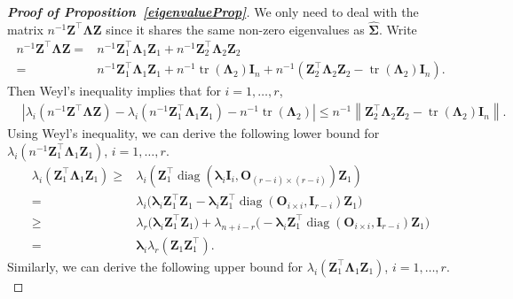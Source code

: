 \documentclass[12pt]{article} %
\DeclareMathOperator{\mytr}{tr}
\DeclareMathOperator{\mydiag}{diag}
\newcommand{\bZ}{\mathbf{Z}}
\newcommand{\bO}{\mathbf{O}}
\newcommand{\bI}{\mathbf{I}}
\newcommand{\bfsym}[1]{\ensuremath{\boldsymbol{#1}}}
\def\blambda {\bfsym {\lambda}}
\def\bLambda {\bfsym {\Lambda}}
\def\bSigma {\bfsym {\Sigma}}
\theoremstyle{definition}
\begin{document}
\begin{appendices}
\begin{proof}[\textbf{Proof of Proposition~\ref{eigenvalueProp}}]
    We only need to deal with the matrix $n^{-1}\bZ^\top \bLambda \bZ$ since it shares the same non-zero eigenvalues as $\hat{\bSigma}$.
    Write
    \begin{equation*}
        \begin{split}
        n^{-1}\bZ^\top \bLambda \bZ=&
        n^{-1}\bZ_1^\top \bLambda_1 \bZ_1+
        n^{-1}\bZ_2^\top \bLambda_2 \bZ_2
        \\
        =&
        n^{-1}\bZ_1^\top \bLambda_1 \bZ_1+
        n^{-1}\mytr(\bLambda_2)\bI_n+
        n^{-1}\left(\bZ_2^\top \bLambda_2 \bZ_2-\mytr(\bLambda_2)\bI_n\right)
        .
        \end{split}
    \end{equation*}
    Then Weyl's inequality implies that for $ i=1,\ldots, r$,
    \begin{equation}\label{eigenBoundForF}
        \begin{split}
        &
        \left|
        \lambda_i\left(n^{-1}\bZ^\top \bLambda \bZ\right)
        -
        \lambda_i(n^{-1}\bZ_1^\top \bLambda_1 \bZ_1)
        -
        n^{-1}
        \mytr(\bLambda_2)
        \right|
        \leq
        n^{-1}\left\|\bZ_2^\top \bLambda_2 \bZ_2-
        \mytr(\bLambda_2)
        \bI_n\right\|.
        \end{split}
    \end{equation}
    Using Weyl's inequality, we can derive the following lower bound for $\lambda_i(n^{-1}\bZ_1^\top \bLambda_1 \bZ_1)$, $ i=1,\ldots, r$.
\begin{equation*}\label{eq:DLower}
\begin{aligned}
\lambda_i(\bZ_1^\top \bLambda_1 \bZ_1)
\geq&
\lambda_i(\bZ_1^\top \mydiag(\blambda_i \bI_{i},\bO_{(r-i)\times(r-i)}) \bZ_1)
\\
    =&
    \lambda_i\Big( \blambda_i \bZ_1^\top \bZ_1-\blambda_i\bZ_1^\top \mydiag(\bO_{i\times i}, \bI_{r-i}) \bZ_1\Big)\\
    \geq&
    \lambda_r\Big( \blambda_i \bZ_1^\top \bZ_1\Big)+\lambda_{n+i-r}\Big(-\blambda_i\bZ_1^\top \mydiag(\bO_{i\times i}, \bI_{r-i}) \bZ_1\Big)\\
= &
\blambda_i \lambda_r(\bZ_1\bZ_1^\top).
\end{aligned}
\end{equation*}
Similarly, we can derive the following upper bound for
$\lambda_i(\bZ_1^\top \bLambda_1 \bZ_1)$, $i=1,\ldots,r$.
\begin{equation*}\label{eq:DUpper}

\end{equation*}
\end{proof}
\end{appendices}
\end{document}
